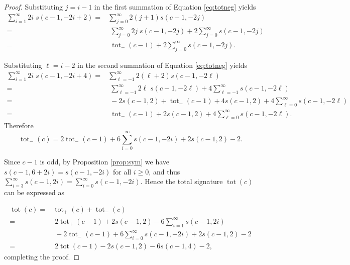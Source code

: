 \documentclass[12pt]{amsart}
\theoremstyle{definition}
\theoremstyle{remark}
\numberwithin{equation}{section}
\def\tot{\operatorname{tot}}
\begin{document}
\begin{proof}
Substituting $j=i-1$ in the first summation of Equation \eqref{eq:totneg} yields
\begin{align*}
\sum_{i=1}^\infty 2i\; s(c-1,-2i+ 2) = & \sum_{j=0}^\infty 2(j+1) s(c-1,-2j)\\
= & \; \sum_{j=0}^\infty 2j \; s(c-1,-2j) + 2\sum_{j=0}^\infty s(c-1,-2j)\\
= & \; \tot_-(c-1) + 2 \sum_{j=0}^\infty s(c-1,-2j).
\end{align*}

Substituting $\ell=i-2$ in the second summation of Equation \eqref{eq:totneg} yields 
\begin{align*}
\sum_{i=1}^\infty 2i \; s(c-1,-2i+ 4) = & \sum_{\ell=-1}^\infty 2(\ell + 2) s(c-1,-2\ell)\\
= & \; \sum_{\ell = -1}^\infty 2\ell \; s(c-1,-2\ell) + 4 \sum_{\ell = -1}^\infty  s(c-1,-2\ell)\\
= & \; -2s(c-1,2) + \tot_-(c-1) + 4s(c-1,2) +4 \sum_{\ell=0}^\infty s(c-1,-2\ell)\\
= & \; \tot_-(c-1) + 2s(c-1,2) +  4 \sum_{\ell=0}^\infty s(c-1,-2\ell).
\end{align*}
Therefore
\[\tot_-(c) = 2\tot_-(c-1) + 6 \sum_{i=0}^\infty s(c-1,-2i) + 2s(c-1,2) - 2.\]

Since $c-1$ is odd, by
Proposition \ref{prop:sym} we have $s(c-1, 6+2i) = s(c-1,-2i)$ for all $i\geq 0$, and thus $\sum_{i=3}^\infty s(c-1,2i) = \sum_{i=0}^\infty s(c-1,-2i).$ Hence the total signature $\tot(c)$ can be expressed as

\begin{align*}
\tot(c) = & \tot_+(c) + \tot_-(c)\\
= & \;2\tot_+(c-1) +2s(c-1,2)-6\sum_{i=1}^\infty s(c-1,2i) \\
& \;+ 2\tot_-(c-1) + 6 \sum_{i=0}^\infty s(c-1,-2i) + 2s(c-1,2) - 2 \\
= & \; 2\tot(c-1) -2s(c-1,2) - 6s(c-1,4) - 2,
\end{align*}
completing the proof. 
\end{proof}
\end{document}
